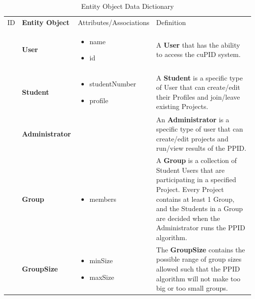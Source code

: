 \documentclass[12pt,letterpaper]{article}
\begin{document}
\begin{table}[H]
	\caption{Entity Object Data Dictionary}
	\begin{tabu} to 
		\tableheader{}ID & Entity Object & Attributes/\newline Associations & Definition\\
		 & User & 
		\begin{minipage}[t]{\linewidth}
			\begin{itemize}
				\item name
				\item id
			\end{itemize}
		\end{minipage} & 
		A \textbf{User} that has the ability to access the cuPID system.\\
		
		 & Student & 
		\begin{minipage}[t]{\linewidth}
			\begin{itemize}
				\item studentNumber
				\item profile
			\end{itemize}
		\end{minipage} & 
		A \textbf{Student} is a specific type of User that can create/edit their Profiles and join/leave existing Projects.\\
		
		 & Administrator & 
		&
		An \textbf{Administrator} is a specific type of user that can create/edit projects and run/view results of the PPID.\\

		 & Group & 
		\begin{minipage}[t]{\linewidth}
			\begin{itemize}
				\item members
			\end{itemize}
		\end{minipage} & 
		A \textbf{Group} is a collection of Student Users that are participating in a specified Project. Every Project contains at least 1 Group, and the Students in a Group are decided when the Administrator runs the PPID algorithm.\\

		 & GroupSize & 
		\begin{minipage}[t]{\linewidth}
			\begin{itemize}
				\item minSize
				\item maxSize
			\end{itemize}
		\end{minipage} & 
		The \textbf{GroupSize} contains the possible range of group sizes allowed such that the PPID algorithm will not make too big or too small groups.\\


\end{tabu}
\end{table}
\end{document}
